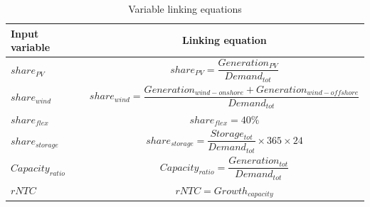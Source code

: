 \begin{table}[htb]
      \centering
      \begin{tabular}{|m{3.6cm}|c|}
      \hline 
      Input variable & Linking equation \\ \hline
       $share_{PV}$ & $share_{PV}=\dfrac{Generation_{PV}}{Demand_{tot}}$ \\ \hline 
       $share_{wind}$ & $share_{wind}=\dfrac{Generation_{wind-onshore} + Generation_{wind-offshore}}{Demand_{tot}}$ \\ \hline 
       $share_{flex}$ & $share_{flex}=40\%$ \\ \hline 
       $share_{storage}$ & $share_{storage}=\dfrac{Storage_{tot}}{Demand_{tot}}\times 365\times 24$ \\ \hline 
       $Capacity_{ratio}$ & $Capacity_{ratio}=\dfrac{Generation_{tot}}{Demand_{tot}}$ \\ \hline 
       $rNTC$ & $rNTC= Growth_{capacity}$ \\ \hline 
      \end{tabular}
      \caption{Variable linking equations}
      \label{tab:linking-equations}
    \end{table}

